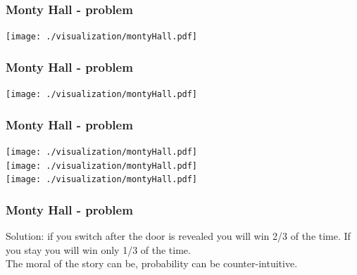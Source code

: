 \documentclass{beamer} %
\newcommand{\1}{\mathbb{1}}
\begin{document}
{		\begin{frame}[t]\frametitle{Monty Hall - problem}    
		\texttt{[image: ./visualization/montyHall.pdf]}
		\end{frame}

		\begin{frame}[t]\frametitle{Monty Hall - problem}    
		\texttt{[image: ./visualization/montyHall.pdf]}
		\end{frame}

		\begin{frame}[t]\frametitle{Monty Hall - problem}    
		\texttt{[image: ./visualization/montyHall.pdf]}\\
		\texttt{[image: ./visualization/montyHall.pdf]}\\
		\texttt{[image: ./visualization/montyHall.pdf]}
		\end{frame}

		\begin{frame}[t]\frametitle{Monty Hall - problem}    
		Solution: if you switch after the door is revealed you will win 2/3 of the time. If you stay you will win only 1/3 of the time.\\
		\vspace{10 mm}
		The moral of the story can be, probability can be counter-intuitive.
		\end{frame}



 }



\end{document}
